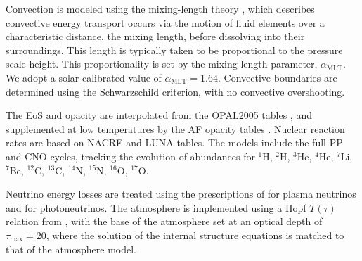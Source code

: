 \documentclass[12pt,a4paper]{article}
\newcommand{\mr}{\mathrm}
\begin{document}
Convection is modeled using the mixing-length theory \parencite[MLT;][]{CoxGiuli1968a}, which describes convective energy transport occurs via the motion of fluid elements over a characteristic distance, the mixing length, before dissolving into their surroundings. This length is typically taken to be proportional to the pressure scale height. This proportionality is set by the mixing-length parameter, $\alpha_\mr{MLT}$. We adopt a solar-calibrated value of $\alpha_\mr{MLT} = 1.64$. Convective boundaries are determined using the Schwarzschild criterion, with no convective overshooting.

The EoS and opacity are interpolated from the OPAL2005 tables \parencite{RogersIglesias1992,IglesiasRogers1996,RogersNayfonov2002}, and supplemented at low temperatures by the AF opacity tables \parencite{FergusonEtAl2005}. Nuclear reaction rates are based on NACRE \parencite{AikawaEtAl2006} and LUNA \parencite{BrogginiEtAl2018} tables. The models include the full PP and CNO cycles, tracking the evolution of abundances for $^{1}\mr{H}$, $^{2}\mr{H}$, $^{3}\mr{He}$, $^{4}\mr{He}$, $^{7}\mr{Li}$, $^{7}\mr{Be}$, $^{12}\mr{C}$, $^{13}\mr{C}$, $^{14}\mr{N}$, $^{15}\mr{N}$, $^{16}\mr{O}$, $^{17}\mr{O}$.

Neutrino energy losses are treated using the prescriptions of \textcite{HaftEtAl1994} for plasma neutrinos and \textcite{Weigert1966} for photoneutrinos. The atmosphere is implemented using a Hopf $T(\tau)$ relation from \textcite{HubenyMihalas2015}, with the base of the atmosphere set at an optical depth of $\tau_{\max} = 20$, where the solution of the internal structure equations is matched to that of the atmosphere model.
\end{document}
